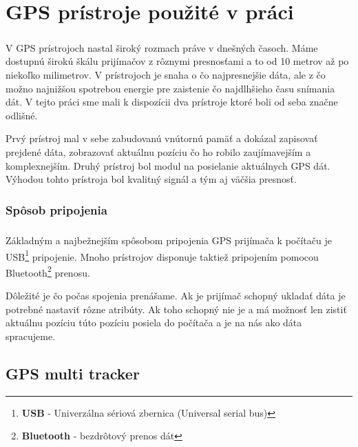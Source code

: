 \chapter{GPS prístroje použité v práci}
\paragraph{}
V GPS prístrojoch nastal široký rozmach práve v dnešných časoch. Máme dostupnú
širokú škálu prijímačov z rôznymi presnosťami a to od 10 metrov až po niekoľko
milimetrov. V prístrojoch je snaha o čo najpresnejšie dáta, ale z čo možno najnižšou spotrebou energie pre zaistenie čo najdlhšieho času snímania dát. V tejto práci sme mali k dispozícii dva prístroje ktoré boli od seba značne
odlišné.

Prvý prístroj mal v sebe zabudovanú vnútornú pamäť a dokázal zapisovať prejdené dáta, zobrazovať aktuálnu pozíciu čo ho robilo zaujímavejším a komplexnejším.
Druhý prístroj bol modul na posielanie aktuálnych GPS dát. Výhodou tohto prístroja bol kvalitný signál a tým aj väčšia presnosť.

\subsection*{Spôsob pripojenia}
\paragraph{}
Základným a najbežnejším spôsobom pripojenia GPS prijímača k počítaču je USB\footnote{\textbf{USB} - Univerzálna sériová zbernica (Universal serial bus)}
pripojenie. Mnoho prístrojov disponuje taktiež pripojením pomocou Bluetooth\footnote{\textbf{Bluetooth} - bezdrôtový prenos dát} prenosu.

Dôležité je čo počas spojenia prenášame. Ak je prijímač schopný ukladať dáta je
potrebné nastaviť rôzne atribúty. Ak toho schopný nie je a má možnosť len zistiť
aktuálnu pozíciu túto pozíciu posiela do počítača a je na nás ako dáta spracujeme. 

\section{GPS multi tracker}
